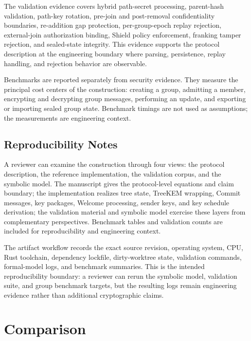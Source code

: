\documentclass[preprint,12pt]{elsarticle}
\theoremstyle{definition}
\newcommand{\tech}[1]{\textnormal{#1}}
\newcommand{\Shield}{\tech{Shield}}
\begin{document}
The validation evidence covers hybrid path-secret processing, parent-hash
validation, path-key rotation, pre-join and post-removal confidentiality
boundaries, re-addition gap protection, per-group-epoch replay rejection,
external-join authorization binding, \Shield{} policy enforcement, franking
tamper rejection, and sealed-state integrity. This evidence supports the
protocol description at the engineering boundary where parsing, persistence,
replay handling, and rejection behavior are observable.

Benchmarks are reported separately from security evidence. They measure
the principal cost centers of the construction: creating a group, admitting a
member, encrypting and decrypting group messages, performing an update, and
exporting or importing sealed group state. Benchmark timings are not used as
assumptions; the measurements are engineering context.

\subsection{Reproducibility Notes}

A reviewer can examine the construction through four views: the protocol
description, the reference implementation, the validation corpus, and the
symbolic model. The manuscript gives the protocol-level equations and claim
boundary; the implementation realizes tree state, TreeKEM wrapping, Commit
messages, key packages, Welcome processing, sender keys, and key schedule
derivation; the validation material and symbolic model exercise these layers
from complementary perspectives. Benchmark tables and validation counts are
included for reproducibility and engineering context.

The artifact workflow records the exact source revision, operating system, CPU,
Rust toolchain, dependency lockfile, dirty-worktree state, validation commands,
formal-model logs, and benchmark summaries. This is the intended
reproducibility boundary: a reviewer can rerun the symbolic model, validation
suite, and group benchmark targets, but the resulting logs remain engineering
evidence rather than additional cryptographic claims.

\section{Comparison}
\end{document}
